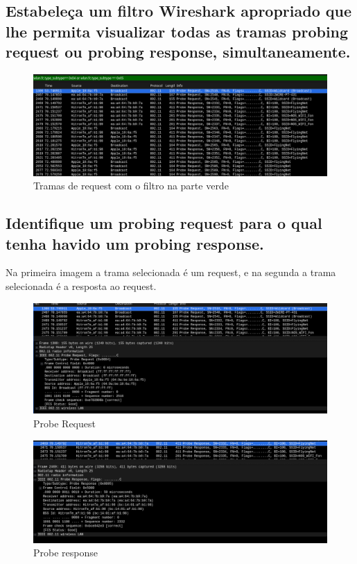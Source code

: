 \documentclass[a4paper]{article}
\begin{document}
\subsection{Estabeleça um filtro Wireshark apropriado que lhe permita visualizar todas as
tramas probing request ou probing response, simultaneamente.}
\begin{figure}[H]
\centering
\includegraphics[scale=0.30]{pics/p10.png}
\caption{Tramas de request  com o filtro na parte verde}
\end{figure}
\subsection{Identifique um probing request para o qual tenha havido um probing response.}
Na primeira imagem a trama selecionada é um request, e na segunda a trama selecionada é a resposta ao request.
\begin{figure}[H]
\centering
\includegraphics[scale=0.30]{pics/p111.png}
\caption{Probe Request}
\end{figure}
\begin{figure}[H]
\centering
\includegraphics[scale=0.30]{pics/p112.png}
\caption{Probe response}
\end{figure}
\end{document}
